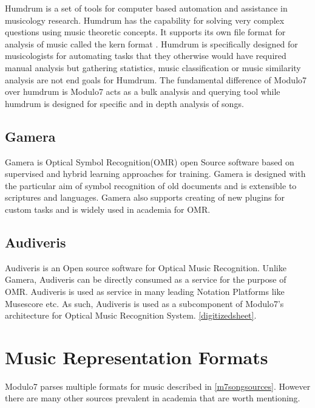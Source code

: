 \noindent Humdrum \cite{humdrum} is a set of tools for computer based automation and assistance in musicology research. Humdrum has the capability for solving very complex questions using music theoretic concepts. It supports its own file format for analysis of music called the kern format \cite{humdrumkern}. Humdrum is specifically designed for musicologists for automating tasks that they otherwise would have required manual analysis but gathering statistics, music classification or music similarity analysis are not end goals for Humdrum. The fundamental difference of Modulo7 over humdrum is Modulo7 acts as a bulk analysis and querying tool while humdrum is designed for specific and in depth analysis of songs.

\subsection{Gamera}

\noindent Gamera \cite{gamera} is Optical Symbol Recognition(OMR) open Source software based on supervised and hybrid learning approaches for training. Gamera is designed with the particular aim of symbol recognition of old documents and is extensible to scriptures and languages. Gamera also supports creating of new plugins for custom tasks and is widely used in academia for OMR. 

\subsection{Audiveris} \label{audiveris}

\noindent Audiveris \cite{audiverishandbook} is an Open source software for Optical Music Recognition. Unlike Gamera, Audiveris can be directly consumed as a service for the purpose of OMR.  Audiveris is used as service in many leading Notation Platforms like Musescore etc. As such, Audiveris is used as a subcomponent of Modulo7's architecture for Optical Music Recognition System. \ref{digitizedsheet}. 

\section{Music Representation Formats} \label{musicrepresentation}

\noindent Modulo7 parses multiple formats for music described in \ref{m7songsources}. However there are many other sources prevalent in academia that are worth mentioning. \\

